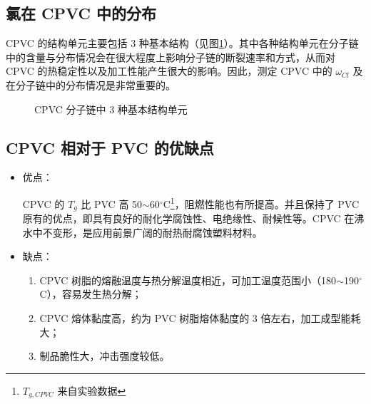 \documentclass[a4paper, oneside, onecolumn, 12pt]{ctexrep}    %
\newcommand{\cd}{$^{\circ}$C}  %
\begin{document}
\subsection{氯在 CPVC 中的分布}
CPVC 的结构单元主要包括 3 种基本结构（见图\ref{fig1}）。其中各种结构单元在分子链中的含量与分布情况会在很大程度上影响分子链的断裂速率和方式，从而对 CPVC 的热稳定性以及加工性能产生很大的影响。因此，测定 CPVC 中的 $\omega_{Cl}$ 及在分子链中的分布情况是非常重要的。

\begin{figure}[htbp]
    \begin{center}
        \begin{minipage}[t]{0.2\linewidth}
            \centering
        \end{minipage}
        \begin{minipage}[t]{0.2\linewidth}
            \centering
        \end{minipage}
        \begin{minipage}[t]{0.2\linewidth}
            \centering
        \end{minipage}
    \end{center}
    \caption{CPVC 分子链中 3 种基本结构单元}
    \label{fig1}
\end{figure}

\subsection{CPVC 相对于 PVC 的优缺点}
\begin{itemize}
    \item{
        优点：\par
        CPVC 的 $T_g$ 比 PVC 高 50$\sim$60\cd\footnote{$T_{g, CPVC}$ 来自实验数据}，阻燃性能也有所提高。并且保持了 PVC 原有的优点，即具有良好的耐化学腐蚀性、电绝缘性、耐候性等。CPVC 在沸水中不变形，是应用前景广阔的耐热耐腐蚀塑料材料。
    }
    \item{
        缺点：\par
        \begin{enumerate}[(1) ]
            \item CPVC 树脂的熔融温度与热分解温度相近，可加工温度范围小（180$\sim$190\cd），容易发生热分解；
            \item CPVC 熔体黏度高，约为 PVC 树脂熔体黏度的 3 倍左右，加工成型能耗大；
            \item 制品脆性大，冲击强度较低。
        \end{enumerate}
    }
\end{itemize}
\end{document}
